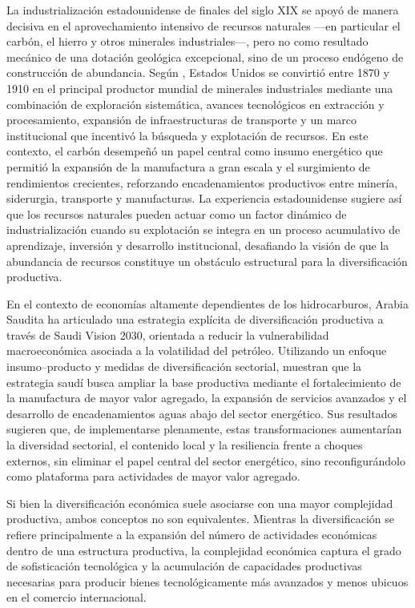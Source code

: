 \documentclass[../../PTFM.tex]{subfiles}
\begin{document}
	La industrialización estadounidense de finales del siglo XIX se apoyó de manera decisiva en el aprovechamiento intensivo de recursos naturales —en particular el carbón, el hierro y otros minerales industriales—, pero no como resultado mecánico de una dotación geológica excepcional, sino de un proceso endógeno de construcción de abundancia. Según \textcite{David1997}, Estados Unidos se convirtió entre 1870 y 1910 en el principal productor mundial de minerales industriales mediante una combinación de exploración sistemática, avances tecnológicos en extracción y procesamiento, expansión de infraestructuras de transporte y un marco institucional que incentivó la búsqueda y explotación de recursos. En este contexto, el carbón desempeñó un papel central como insumo energético que permitió la expansión de la manufactura a gran escala y el surgimiento de rendimientos crecientes, reforzando encadenamientos productivos entre minería, siderurgia, transporte y manufacturas. La experiencia estadounidense sugiere así que los recursos naturales pueden actuar como un factor dinámico de industrialización cuando su explotación se integra en un proceso acumulativo de aprendizaje, inversión y desarrollo institucional, desafiando la visión de que la abundancia de recursos constituye un obstáculo estructural para la diversificación productiva.
	
	En el contexto de economías altamente dependientes de los hidrocarburos, Arabia Saudita ha articulado una estrategia explícita de diversificación productiva a través de Saudi Vision 2030, orientada a reducir la vulnerabilidad macroeconómica asociada a la volatilidad del petróleo. Utilizando un enfoque insumo--producto y medidas de diversificación sectorial, \textcite{Havrlant2021} muestran que la estrategia saudí busca ampliar la base productiva mediante el fortalecimiento de la manufactura de mayor valor agregado, la expansión de servicios avanzados y el desarrollo de encadenamientos aguas abajo del sector energético. Sus resultados sugieren que, de implementarse plenamente, estas transformaciones aumentarían la diversidad sectorial, el contenido local y la resiliencia frente a choques externos, sin eliminar el papel central del sector energético, sino reconfigurándolo como plataforma para actividades de mayor valor agregado.
	
	Si bien la diversificación económica suele asociarse con una mayor complejidad productiva, ambos conceptos no son equivalentes. Mientras la diversificación se refiere principalmente a la expansión del número de actividades económicas dentro de una estructura productiva, la complejidad económica captura el grado de sofisticación tecnológica y la acumulación de capacidades productivas necesarias para producir bienes tecnológicamente más avanzados y menos ubicuos en el comercio internacional.
	
\end{document}
